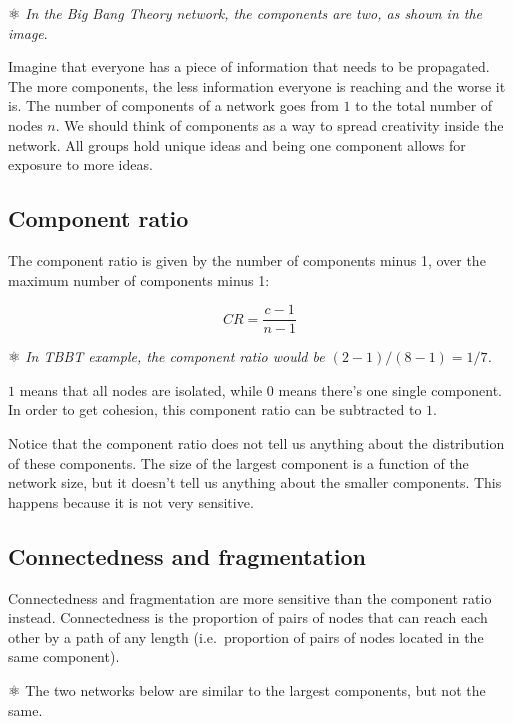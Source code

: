 \documentclass[
  notitlepage,
  onecolumn,
  openany]{book}
\begin{document}
⚛️ \emph{In the Big Bang Theory network, the components are two, as shown in the image}.

Imagine that everyone has a piece of information that needs to be propagated. The more components, the less information everyone is reaching and the worse it is. The number of components of a network goes from \(1\) to the total number of nodes \(n\). We should think of components as a way to spread creativity inside the network. All groups hold unique ideas and being one component allows for exposure to more ideas.

\hypertarget{component-ratio}{%
\subsection{Component ratio}\label{component-ratio}}

The component ratio is given by the number of components minus 1, over the maximum number of components minus 1:

\[
CR = \frac{c-1}{n-1}
\]

⚛️ \emph{In TBBT example, the component ratio would be \((2-1)/(8-1) = 1/7\).}

\(1\) means that all nodes are isolated, while \(0\) means there's one single component. In order to get cohesion, this component ratio can be subtracted to \(1\).

Notice that the component ratio does not tell us anything about the distribution of these components. The size of the largest component is a function of the network size, but it doesn't tell us anything about the smaller components. This happens because it is not very sensitive.

\hypertarget{connectedness-and-fragmentation}{%
\subsection{Connectedness and fragmentation}\label{connectedness-and-fragmentation}}

Connectedness and fragmentation are more sensitive than the component ratio instead. Connectedness is the proportion of pairs of nodes that can reach each other by a path of any length (i.e.~proportion of pairs of nodes located in the same component).

⚛️ The two networks below are similar to the largest components, but not the same.
\end{document}
